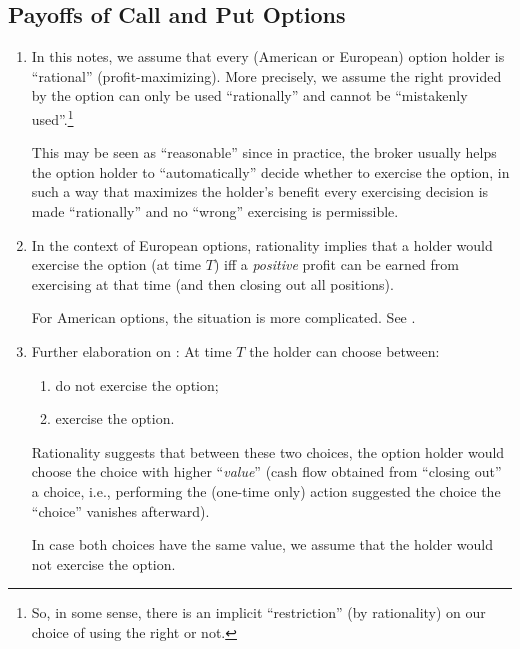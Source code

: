 \subsection{Payoffs of Call and Put Options}
\begin{enumerate}
\item \label{it:option-holder-rational}
In this notes, we assume that every (American or European) option holder
is ``rational'' (profit-maximizing). More precisely, we assume the right
provided by the option can only be used ``rationally'' and cannot be
``mistakenly used''.\footnote{So, in some sense, there is an implicit
``restriction'' (by rationality) on our choice of using the right or not.}

This may be seen as ``reasonable'' since in practice, the broker usually helps
the option holder to ``automatically'' decide whether to exercise the option,
in such a way that maximizes the holder's benefit  every
exercising decision is made ``rationally'' and no ``wrong'' exercising is
permissible.

\item \label{it:euro-option-rational}
In the context of European options, rationality implies that a holder
would exercise the option (at time \(T\)) iff a \emph{positive} profit can be
earned from exercising at that time (and then closing out all positions).

\begin{note}
For American options, the situation is more complicated. See
.
\end{note}

\item Further elaboration on : At time \(T\)
the holder can choose between:
\begin{enumerate}
\item do not exercise the option;
\item exercise the option.
\end{enumerate}
Rationality suggests that between these two choices, the option holder would
choose the choice with higher ``\emph{value}'' (cash flow obtained from
``closing out'' a choice, i.e., performing the (one-time only) action suggested
the choice  the ``choice'' vanishes afterward).

\begin{note} In case both choices have the same value, we assume that the
holder would not exercise the option.
\end{note}


\end{enumerate}
